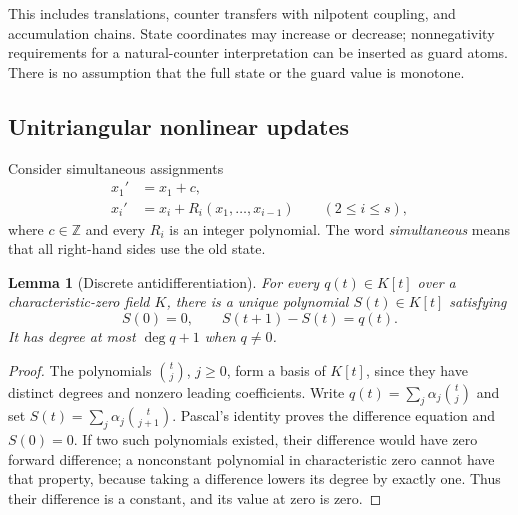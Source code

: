 \documentclass[11pt,a4paper]{article}
\newtheorem{lemma}[lemma]{Lemma}
\theoremstyle{definition}
\theoremstyle{remark}
\newcommand{\Z}{\mathbb Z}
\begin{document}
This includes translations, counter transfers with nilpotent coupling,
and accumulation chains. State coordinates may increase or decrease;
nonnegativity requirements for a natural-counter interpretation can be
inserted as guard atoms. There is no assumption that the full state or the
guard value is monotone.

\subsection{Unitriangular nonlinear updates}
Consider simultaneous assignments
\begin{align}
 x_1'&=x_1+c,\nonumber\\
 x_i'&=x_i+R_i(x_1,\ldots,x_{i-1})\qquad(2\leq i\leq s),
 \label{cdc:pt:eq:triangular}
\end{align}
where $c\in\Z$ and every $R_i$ is an integer polynomial. The word
\emph{simultaneous} means that all right-hand sides use the old state.

\begin{lemma}[Discrete antidifferentiation]
\label{cdc:pt:lem:antidifference}
For every $q(t)\in K[t]$ over a characteristic-zero field $K$, there is a
unique polynomial $S(t)\in K[t]$ satisfying
\[
 S(0)=0,\qquad S(t+1)-S(t)=q(t).
\]
It has degree at most $\deg q+1$ when $q\neq0$.
\end{lemma}
\begin{proof}
The polynomials $\binom tj$, $j\geq0$, form a basis of $K[t]$, since
they have distinct degrees and nonzero leading coefficients. Write
$q(t)=\sum_j\alpha_j\binom tj$ and set
$S(t)=\sum_j\alpha_j\binom t{j+1}$. Pascal's identity proves the
difference equation and $S(0)=0$. If two such polynomials existed, their
difference would have zero forward difference; a nonconstant polynomial
in characteristic zero cannot have that property, because taking a
difference lowers its degree by exactly one. Thus their difference is a
constant, and its value at zero is zero.
\end{proof}
\end{document}
